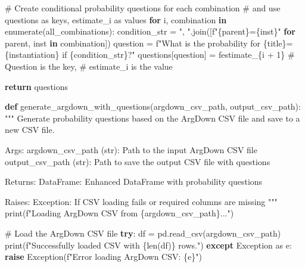 \documentclass[
  11pt,
  letterpaper,
]{book}
\newenvironment{Shaded}{\begin{snugshade}}{\end{snugshade}}
\newcommand{\BuiltInTok}[1]{\textcolor[rgb]{0.00,0.23,0.31}{#1}}
\newcommand{\CommentTok}[1]{\textcolor[rgb]{0.37,0.37,0.37}{#1}}
\newcommand{\ControlFlowTok}[1]{\textcolor[rgb]{0.00,0.23,0.31}{\textbf{#1}}}
\newcommand{\DecValTok}[1]{\textcolor[rgb]{0.68,0.00,0.00}{#1}}
\newcommand{\ImportTok}[1]{\textcolor[rgb]{0.00,0.46,0.62}{#1}}
\newcommand{\KeywordTok}[1]{\textcolor[rgb]{0.00,0.23,0.31}{\textbf{#1}}}
\newcommand{\NormalTok}[1]{\textcolor[rgb]{0.00,0.23,0.31}{#1}}
\newcommand{\OperatorTok}[1]{\textcolor[rgb]{0.37,0.37,0.37}{#1}}
\newcommand{\PreprocessorTok}[1]{\textcolor[rgb]{0.68,0.00,0.00}{#1}}
\newcommand{\SpecialCharTok}[1]{\textcolor[rgb]{0.37,0.37,0.37}{#1}}
\newcommand{\SpecialStringTok}[1]{\textcolor[rgb]{0.13,0.47,0.30}{#1}}
\newcommand{\StringTok}[1]{\textcolor[rgb]{0.13,0.47,0.30}{#1}}
\begin{document}
\begin{Shaded}
\begin{Highlighting}[]
    \CommentTok{\# Create conditional probability questions for each combination}
    \CommentTok{\# and use questions as keys, estimate\_i as values}
    \ControlFlowTok{for}\NormalTok{ i, combination }\KeywordTok{in} \BuiltInTok{enumerate}\NormalTok{(all\_combinations):}
\NormalTok{        condition\_str }\OperatorTok{=} \StringTok{", "}\NormalTok{.join([}\SpecialStringTok{f"}\SpecialCharTok{\{}\NormalTok{parent}\SpecialCharTok{\}}\SpecialStringTok{=}\SpecialCharTok{\{}\NormalTok{inst}\SpecialCharTok{\}}\SpecialStringTok{"} \ControlFlowTok{for}\NormalTok{ parent, inst }\KeywordTok{in}\NormalTok{ combination])}
\NormalTok{        question }\OperatorTok{=} \SpecialStringTok{f"What is the probability for }\SpecialCharTok{\{}\NormalTok{title}\SpecialCharTok{\}}\SpecialStringTok{=}\SpecialCharTok{\{}\NormalTok{instantiation}\SpecialCharTok{\}}\SpecialStringTok{ if }\SpecialCharTok{\{}\NormalTok{condition\_str}\SpecialCharTok{\}}\SpecialStringTok{?"}
\NormalTok{        questions[question] }\OperatorTok{=} \SpecialStringTok{f\textquotesingle{}estimate\_}\SpecialCharTok{\{}\NormalTok{i }\OperatorTok{+} \DecValTok{1}\SpecialCharTok{\}}\SpecialStringTok{\textquotesingle{}}  \CommentTok{\# Question is the key,}
                                                   \CommentTok{\# estimate\_i is the value}

    \ControlFlowTok{return}\NormalTok{ questions}


\KeywordTok{def}\NormalTok{ generate\_argdown\_with\_questions(argdown\_csv\_path, output\_csv\_path):}
    \CommentTok{"""}
\CommentTok{    Generate probability questions based on the ArgDown CSV file and save}
\CommentTok{    to a new CSV file.}

\CommentTok{    Args:}
\CommentTok{        argdown\_csv\_path (str): Path to the input ArgDown CSV file}
\CommentTok{        output\_csv\_path (str): Path to save the output CSV file with questions}

\CommentTok{    Returns:}
\CommentTok{        DataFrame: Enhanced DataFrame with probability questions}

\CommentTok{    Raises:}
\CommentTok{        Exception: If CSV loading fails or required columns are missing}
\CommentTok{    """}
    \BuiltInTok{print}\NormalTok{(}\SpecialStringTok{f"Loading ArgDown CSV from }\SpecialCharTok{\{}\NormalTok{argdown\_csv\_path}\SpecialCharTok{\}}\SpecialStringTok{..."}\NormalTok{)}

    \CommentTok{\# Load the ArgDown CSV file}
    \ControlFlowTok{try}\NormalTok{:}
\NormalTok{        df }\OperatorTok{=}\NormalTok{ pd.read\_csv(argdown\_csv\_path)}
        \BuiltInTok{print}\NormalTok{(}\SpecialStringTok{f"Successfully loaded CSV with }\SpecialCharTok{\{}\BuiltInTok{len}\NormalTok{(df)}\SpecialCharTok{\}}\SpecialStringTok{ rows."}\NormalTok{)}
    \ControlFlowTok{except} \PreprocessorTok{Exception} \ImportTok{as}\NormalTok{ e:}
        \ControlFlowTok{raise} \PreprocessorTok{Exception}\NormalTok{(}\SpecialStringTok{f"Error loading ArgDown CSV: }\SpecialCharTok{\{}\NormalTok{e}\SpecialCharTok{\}}\SpecialStringTok{"}\NormalTok{)}


\end{Highlighting}
\end{Shaded}
\end{document}
